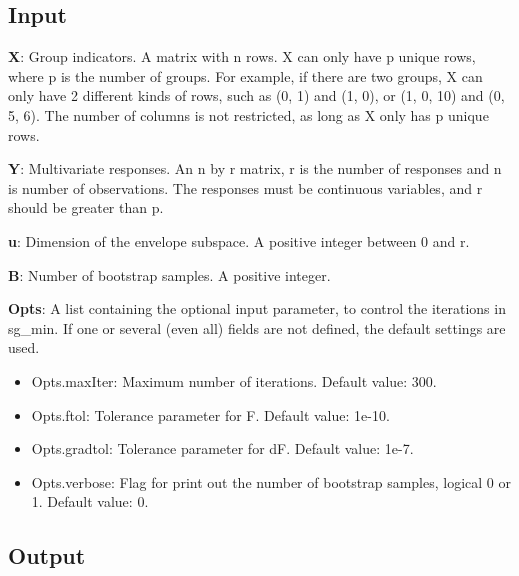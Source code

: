 \documentclass[a4paper,11pt,openany]{memoir}
\begin{document}
\subsection*{Input}

\begin{par}
\textbf{X}: Group indicators. A matrix with n rows.  X can only have p unique  rows, where p is the number of groups. For example, if there are two groups, X can only have 2 different kinds of rows, such as (0, 1) and (1, 0), or (1, 0, 10) and (0, 5, 6).  The number of columns is not restricted, as long as X only has p unique rows.
\end{par} \vspace{1em}
\begin{par}
\textbf{Y}: Multivariate responses. An n by r matrix, r is the number of responses and n is number of observations. The responses must be continuous variables, and r should be greater than p.
\end{par} \vspace{1em}
\begin{par}
\textbf{u}: Dimension of the envelope subspace.  A positive integer between 0 and r.
\end{par} \vspace{1em}
\begin{par}
\textbf{B}: Number of bootstrap samples.  A positive integer.
\end{par} \vspace{1em}
\begin{par}
\textbf{Opts}: A list containing the optional input parameter, to control the iterations in sg\_min. If one or several (even all) fields are not defined, the default settings are used.
\end{par} \vspace{1em}
\begin{itemize}
\setlength{\itemsep}{-1ex}
   \item Opts.maxIter: Maximum number of iterations.  Default value: 300.
   \item Opts.ftol: Tolerance parameter for F.  Default value: 1e-10.
   \item Opts.gradtol: Tolerance parameter for dF.  Default value: 1e-7.
   \item Opts.verbose: Flag for print out the number of bootstrap samples, logical 0 or 1. Default value: 0.
\end{itemize}


\subsection*{Output}
\end{document}
